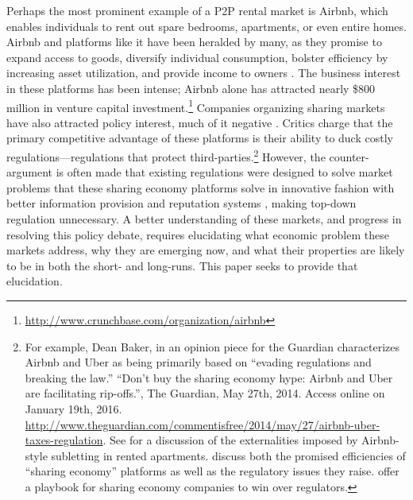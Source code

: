 \documentclass[11pt]{article}
\begin{document}
Perhaps the most prominent example of a P2P rental market is Airbnb, which enables individuals to rent out spare bedrooms, apartments, or even entire homes. 
Airbnb and platforms like it have been heralded by many, as they promise to expand access to goods, diversify individual consumption, bolster efficiency by increasing asset utilization, and provide income to owners \citep{sundararajan2013zipcar, edelman2015efficiencies, botsman2010s}.
The business interest in these platforms has been intense; Airbnb alone has attracted nearly \$800 million in venture capital investment.\footnote{\href{http://www.crunchbase.com/organization/airbnb}{http://www.crunchbase.com/organization/airbnb}}
Companies organizing sharing markets have also attracted policy interest, much of it negative \citep{slee2015, malhotra2014dark, avital2015}. 
Critics charge that the primary competitive advantage of these platforms is their ability to duck costly regulations---regulations that protect third-parties.\footnote{
  For example, Dean Baker, in an opinion piece for the Guardian characterizes Airbnb and Uber as being primarily based on ``evading regulations and breaking the law.''
  ``Don't buy the sharing economy hype: Airbnb and Uber are facilitating rip-offs.'', The Guardian, May 27th, 2014. Access online on January 19th, 2016.
  \url{http://www.theguardian.com/commentisfree/2014/may/27/airbnb-uber-taxes-regulation}. 
  See \cite{horton2014tragedy} for a discussion of the externalities imposed by Airbnb-style subletting in rented apartments.
  \cite{edelman2015efficiencies} discuss both the promised efficiencies of ``sharing economy'' platforms as well as the regulatory issues they raise.
  \cite{cannon2014uber} offer a playbook for sharing economy companies to win over regulators.
}   
However, the counter-argument is often made that existing regulations were designed to solve market problems that these sharing economy platforms solve in innovative fashion with better information provision and reputation systems \citep{koopman2014sharing}, making top-down regulation unnecessary.  
A better understanding of these markets, and progress in resolving this policy debate, requires elucidating what economic problem these markets address, why they are emerging now, and what their properties are likely to be in both the short- and long-runs. 
This paper seeks to provide that elucidation. 
\end{document}
